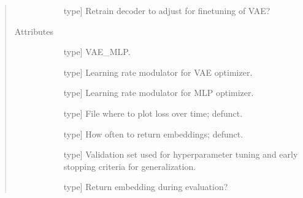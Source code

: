\documentclass[letterpaper,10pt,english]{sphinxmanual}
\begin{document}
\begin{fulllineitems}
\begin{quote}
\begin{description}
\begin{description}
\item[{}] \leavevmode{[}type{]}
Retrain decoder to adjust for finetuning of VAE?

\end{description}

\item[{Attributes}] \leavevmode\begin{description}
\item[{}] \leavevmode{[}type{]}
VAE\_MLP.

\item[{}] \leavevmode{[}type{]}
Learning rate modulator for VAE optimizer.

\item[{}] \leavevmode{[}type{]}
Learning rate modulator for MLP optimizer.

\item[{}] \leavevmode{[}type{]}
File where to plot loss over time; defunct.

\item[{}] \leavevmode{[}type{]}
How often to return embeddings; defunct.

\item[{}] \leavevmode{[}type{]}
Validation set used for hyperparameter tuning and early stopping criteria for generalization.

\item[{}] \leavevmode{[}type{]}
Return embedding during evaluation?

\item[{}] \leavevmode
\item[{}] \leavevmode
\item[{}] \leavevmode
\item[{}] \leavevmode
\item[{}] \leavevmode
\item[{}] \leavevmode
\item[{}] \leavevmode
\item[{}] \leavevmode
\end{description}


\end{description}
\end{quote}
\end{fulllineitems}
\end{document}
